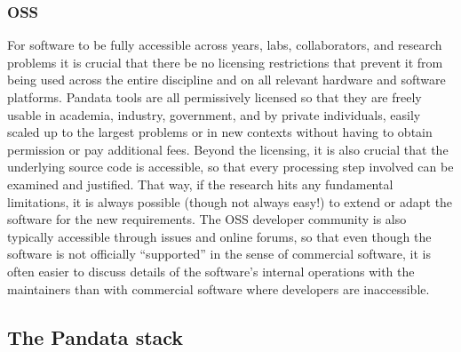 \subsubsection{OSS}
For software to be fully accessible across years, labs, collaborators, and research problems it is crucial that there be no licensing restrictions that prevent it from being used across the entire discipline and on all relevant hardware and software platforms. Pandata tools are all permissively licensed so that they are freely usable in academia, industry, government, and by private individuals, easily scaled up to the largest problems or in new contexts without having to obtain permission or pay additional fees. Beyond the licensing, it is also crucial that the underlying source code is accessible, so that every processing step involved can be examined and justified. That way, if the research hits any fundamental limitations, it is always possible (though not always easy!) to extend or adapt the software for the new requirements. The OSS developer community is also typically accessible through issues and online forums, so that even though the software is not officially ``supported'' in the sense of commercial software, it is often easier to discuss details of the software's internal operations with the maintainers than with commercial software where developers are inaccessible.

\subsection{The Pandata stack}

